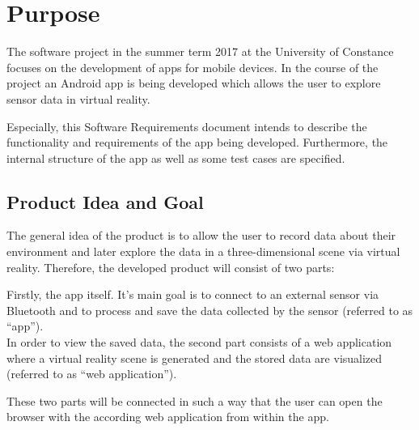 \section{Purpose}

The software project in the summer term 2017 at the University of Constance focuses on the development of apps for mobile devices. In the course of the project an Android app is being developed which allows the user to explore sensor data in virtual reality.

Especially, this Software Requirements document intends to describe the functionality and requirements of the app being developed. Furthermore, the internal structure of the app as well as some test cases are specified.

\subsection{Product Idea and Goal}

The general idea of the product is to allow the user to record data about their environment and later explore the data in a three-dimensional scene via virtual reality. Therefore, the developed product will consist of two parts:

Firstly, the app itself. It's main goal is to connect to an external sensor via Bluetooth and to process and save the data collected by the sensor (referred to as ``app''). \\
In order to view the saved data, the second part consists of a web application where a virtual reality scene is generated and the stored data are visualized (referred to as ``web application''). 

These two parts will be connected in such a way that the user can open the browser with the according web application from within the app.





